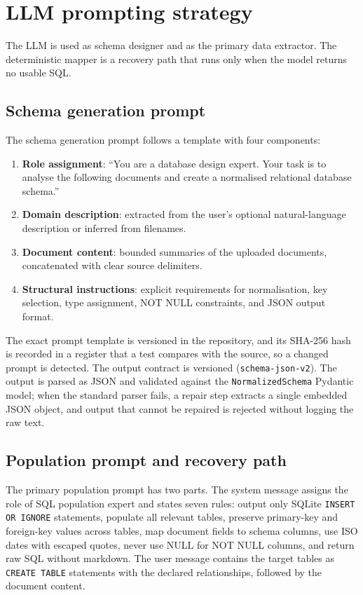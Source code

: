 \documentclass[11pt,a4paper]{article}
\begin{document}
\section{LLM prompting strategy}
\label{sec:prompting}
The LLM is used as schema designer and as the primary data extractor. The deterministic mapper is a recovery path that runs only when the model returns no usable SQL.

\subsection{Schema generation prompt}
The schema generation prompt follows a template with four components:

\begin{enumerate}
  \item \textbf{Role assignment}: ``You are a database design expert. Your task is to analyse the following documents and create a normalised relational database schema.''
  \item \textbf{Domain description}: extracted from the user's optional natural-language description or inferred from filenames.
  \item \textbf{Document content}: bounded summaries of the uploaded documents, concatenated with clear source delimiters.
  \item \textbf{Structural instructions}: explicit requirements for normalisation, key selection, type assignment, NOT NULL constraints, and JSON output format.
\end{enumerate}

The exact prompt template is versioned in the repository, and its SHA-256 hash is recorded in a register that a test compares with the source, so a changed prompt is detected. The output contract is versioned (\texttt{schema-json-v2}). The output is parsed as JSON and validated against the \texttt{NormalizedSchema} Pydantic model; when the standard parser fails, a repair step extracts a single embedded JSON object, and output that cannot be repaired is rejected without logging the raw text.

\subsection{Population prompt and recovery path}
The primary population prompt has two parts. The system message assigns the role of SQL population expert and states seven rules: output only SQLite \texttt{INSERT OR IGNORE} statements, populate all relevant tables, preserve primary-key and foreign-key values across tables, map document fields to schema columns, use ISO dates with escaped quotes, never use NULL for NOT NULL columns, and return raw SQL without markdown. The user message contains the target tables as \texttt{CREATE TABLE} statements with the declared relationships, followed by the document content.
\end{document}
